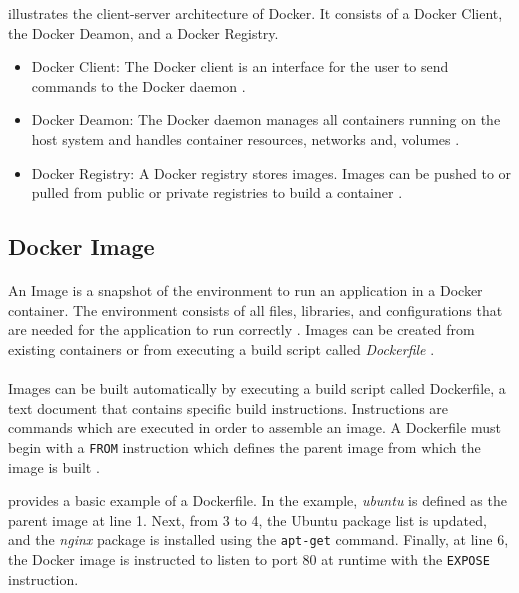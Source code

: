  illustrates the client-server architecture of Docker. It consists of a Docker Client, the Docker Deamon, and a Docker Registry.

\begin{itemize}
\item Docker Client: The Docker client is an interface for the user to send commands to the Docker daemon \cite{Docker2020Docs}.

\item Docker Deamon: The Docker daemon manages all containers running on the host system and handles container resources, networks and, volumes \cite{Bullington2020Docker}.

\item Docker Registry: A Docker registry stores images. Images can be pushed to or pulled from public or private registries to build a container \cite{Docker2020Docs}.
\end{itemize}


\subsection{Docker Image}
\label{subsec:04_docker_image}
\paragraph{}
An Image is a snapshot of the environment to run an application in a Docker container. The environment consists of all files, libraries, and configurations that are needed for the application to run correctly \cite{Docker2020Docs, Nickoloff2019Docker}.
Images can be created from existing containers or from executing a build script called \textit{Dockerfile} \cite{Nickoloff2019Docker}.


\paragraph{}
Images can be built automatically by executing a build script called Dockerfile, a text document that contains specific build instructions. Instructions are commands which are executed in order to assemble an image.
A Dockerfile must begin with a \texttt{FROM} instruction which defines the parent image from which the image is built \cite{Docker2020Docs}.


 provides a basic example of a Dockerfile.
In the example, \textit{ubuntu} is defined as the parent image at line 1.
Next, from 3 to 4, the Ubuntu package list is updated, and the \textit{nginx} package is installed using the \texttt{apt-get} command.
Finally, at line 6, the Docker image is instructed to listen to port 80 at runtime with the \texttt{EXPOSE} instruction.

